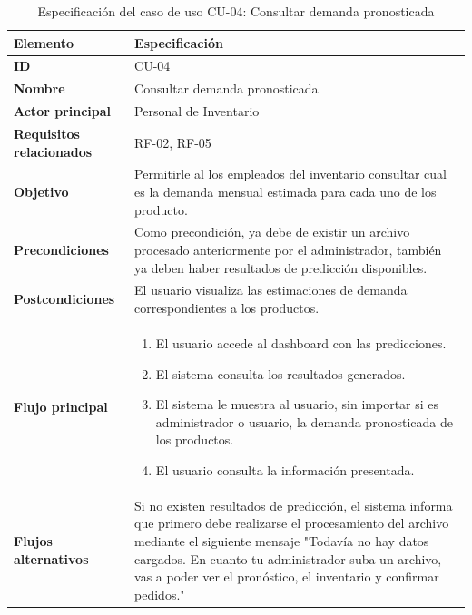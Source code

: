 \begin{table}[H]
\centering
\caption{Especificación del caso de uso CU-04: Consultar demanda pronosticada}
\label{tab:cu04_demanda_pronosticada}
\renewcommand{\arraystretch}{1.3}
\begin{tabularx}{\textwidth}{|>{\bfseries}p{3.5cm}|X|}
\hline
Elemento & Especificación \\
\hline
ID & CU-04 \\
\hline
Nombre & Consultar demanda pronosticada \\
\hline
Actor principal & Personal de Inventario \\
\hline
Requisitos relacionados & RF-02, RF-05 \\
\hline
Objetivo & Permitirle al los empleados del inventario consultar cual es la demanda mensual estimada para cada uno de los producto. \\
\hline
Precondiciones & Como precondición, ya debe de existir un archivo procesado anteriormente por el administrador, también ya deben haber resultados de predicción disponibles. \\
\hline
Postcondiciones & El usuario visualiza las estimaciones de demanda correspondientes a los productos. \\
\hline
Flujo principal &
\begin{enumerate}
    \item El usuario accede al dashboard con las predicciones.
    \item El sistema consulta los resultados generados.
    \item El sistema le muestra al usuario, sin importar si es administrador o usuario, la demanda pronosticada de los productos.
    \item El usuario consulta la información presentada.
\end{enumerate} \\
\hline
Flujos alternativos & Si no existen resultados de predicción, el sistema informa que primero debe realizarse el procesamiento del archivo mediante el siguiente mensaje "Todavía no hay datos cargados. En cuanto tu administrador suba un archivo, vas a poder ver el pronóstico, el inventario y confirmar pedidos." \\
\hline
\end{tabularx}
\end{table}

